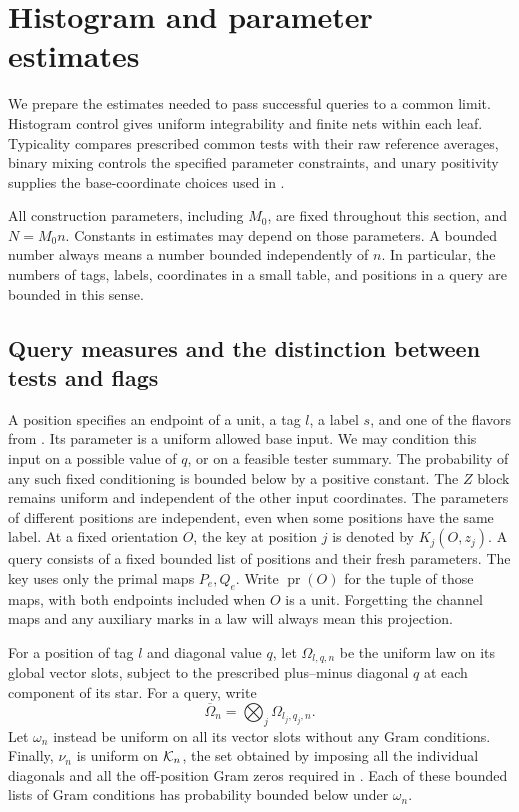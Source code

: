\section{Histogram and parameter estimates}\label{sec:histograms}

We prepare the estimates needed to pass successful queries to a common
limit. Histogram control gives uniform integrability and finite nets
within each leaf. Typicality compares prescribed common tests with
their raw reference averages, binary mixing controls the specified
parameter constraints, and unary positivity supplies the base-coordinate
choices used in .

All construction parameters, including $M_0$, are fixed throughout this
section, and $N=M_0n$. Constants in estimates may depend on those
parameters. A bounded number always means a number bounded independently
of $n$. In particular, the numbers of tags, labels, coordinates in a
small table, and positions in a query are bounded in this sense.

\subsection{Query measures and the distinction between tests and flags}

A position specifies an endpoint of a unit, a tag $l$, a label $s$, and
one of the flavors from . Its parameter is a uniform
allowed base input. We may condition this input on a possible value of
$q$, or on a feasible tester summary. The probability of any such fixed
conditioning is bounded below by a positive constant. The $Z$ block
remains uniform and independent of the other input coordinates. The
parameters of different positions are independent, even when some
positions have the same label. At a fixed orientation $O$, the key at
position $j$ is denoted by $K_j(O,z_j)$. A query consists of a fixed
bounded list of positions and their fresh parameters.
The key uses only the primal maps $P_e,Q_e$.  Write
$\operatorname{pr}(O)$ for the tuple of those maps, with both endpoints
included when $O$ is a unit.  Forgetting the channel maps and any
auxiliary marks in a law will always mean this projection.

For a position of tag $l$ and diagonal value $q$, let
$\Omega_{l,q,n}$ be the uniform law on its global vector slots, subject
to the prescribed plus--minus diagonal $q$ at each component of its star.
For a query, write
\[
 \overline\Omega_n=\bigotimes_j\Omega_{l_j,q_j,n}.
\]
Let $\omega_n$ instead be uniform on all its vector slots without any
Gram conditions. Finally, $\nu_n$ is uniform on $\mathcal K_n$, the set obtained
by imposing all the individual diagonals and all the off-position Gram
zeros required in . Each of these bounded lists of
Gram conditions has probability bounded below under $\omega_n$.

